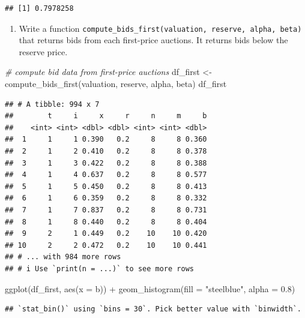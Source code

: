 \documentclass[
]{book}
\newenvironment{Shaded}{\begin{snugshade}}{\end{snugshade}}
\newcommand{\AttributeTok}[1]{\textcolor[rgb]{0.77,0.63,0.00}{#1}}
\newcommand{\CommentTok}[1]{\textcolor[rgb]{0.56,0.35,0.01}{\textit{#1}}}
\newcommand{\FloatTok}[1]{\textcolor[rgb]{0.00,0.00,0.81}{#1}}
\newcommand{\FunctionTok}[1]{\textcolor[rgb]{0.00,0.00,0.00}{#1}}
\newcommand{\NormalTok}[1]{#1}
\newcommand{\OtherTok}[1]{\textcolor[rgb]{0.56,0.35,0.01}{#1}}
\newcommand{\SpecialCharTok}[1]{\textcolor[rgb]{0.00,0.00,0.00}{#1}}
\newcommand{\StringTok}[1]{\textcolor[rgb]{0.31,0.60,0.02}{#1}}
\providecommand{\tightlist}{%
  \setlength{\itemsep}{0pt}\setlength{\parskip}{0pt}}
\begin{document}
\begin{verbatim}
## [1] 0.7978258
\end{verbatim}

\begin{enumerate}
\def\labelenumi{\arabic{enumi}.}
\setcounter{enumi}{4}
\tightlist
\item
  Write a function \texttt{compute\_bids\_first(valuation,\ reserve,\ alpha,\ beta)} that returns bids from each first-price auctions. It returns bids below the reserve price.
\end{enumerate}

\begin{Shaded}
\begin{Highlighting}[]
\CommentTok{\# compute bid data from first{-}price auctions}
\NormalTok{df\_first }\OtherTok{\textless{}{-}} \FunctionTok{compute\_bids\_first}\NormalTok{(valuation, reserve, alpha, beta)}
\NormalTok{df\_first}
\end{Highlighting}
\end{Shaded}

\begin{verbatim}
## # A tibble: 994 x 7
##        t     i     x     r     n     m     b
##    <int> <int> <dbl> <dbl> <int> <int> <dbl>
##  1     1     1 0.390   0.2     8     8 0.360
##  2     1     2 0.410   0.2     8     8 0.378
##  3     1     3 0.422   0.2     8     8 0.388
##  4     1     4 0.637   0.2     8     8 0.577
##  5     1     5 0.450   0.2     8     8 0.413
##  6     1     6 0.359   0.2     8     8 0.332
##  7     1     7 0.837   0.2     8     8 0.731
##  8     1     8 0.440   0.2     8     8 0.404
##  9     2     1 0.449   0.2    10    10 0.420
## 10     2     2 0.472   0.2    10    10 0.441
## # ... with 984 more rows
## # i Use `print(n = ...)` to see more rows
\end{verbatim}

\begin{Shaded}
\begin{Highlighting}[]
\FunctionTok{ggplot}\NormalTok{(df\_first, }\FunctionTok{aes}\NormalTok{(}\AttributeTok{x =}\NormalTok{ b)) }\SpecialCharTok{+} \FunctionTok{geom\_histogram}\NormalTok{(}\AttributeTok{fill =} \StringTok{"steelblue"}\NormalTok{, }\AttributeTok{alpha =} \FloatTok{0.8}\NormalTok{)}
\end{Highlighting}
\end{Shaded}

\begin{verbatim}
## `stat_bin()` using `bins = 30`. Pick better value with `binwidth`.
\end{verbatim}
\end{document}
